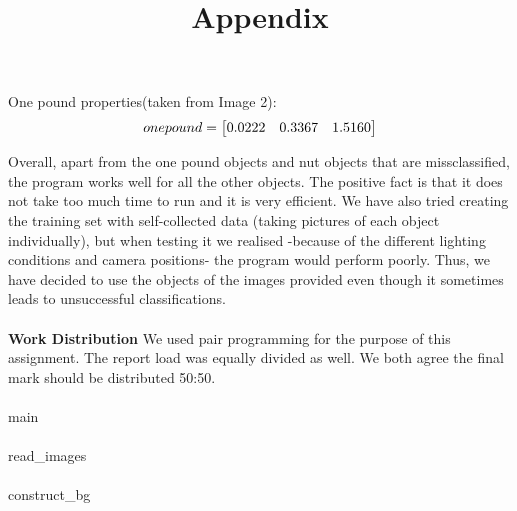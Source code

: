 \documentclass[11pt]{article}
\begin{document}
\paragraph{}
One pound properties(taken from Image 2):
\[
one pound = 
	\setcounter{MaxMatrixCols}{3}
	\begin{bmatrix}
	0.0222 & 0.3367 & 1.5160\\
	\end{bmatrix}
\]

Overall, apart from the one pound objects and nut objects that are missclassified, the program works well for all the other objects. The positive fact is that it does not take too much time to run and it is very efficient. We have also tried creating the training set with self-collected data (taking pictures of each object individually), but when testing it we realised -because of the different lighting conditions and camera positions- the program would perform poorly. Thus, we have decided to use the objects of the images provided even though it sometimes leads to unsuccessful classifications.

\paragraph{}
\textbf{Work Distribution} 
\newline
We used pair programming for the purpose of this assignment. The report load was equally divided as well. We both agree the final mark should be distributed 50:50.

\newpage
\title{Appendix}\setlength{\droptitle}{-70pt}
\date{\vspace{-10ex}}
\maketitle

\paragraph{}
main

\paragraph{}
read\_images

\paragraph{}
construct\_bg

\end{document}
